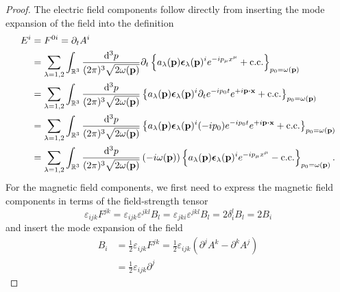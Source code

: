 \begin{proof}
	The electric field components follow directly from inserting the mode expansion of the field into the definition
	\begin{equation*}
		\begin{split}
			E^i
			&=
			F^{0i}
			=
			\partial_t
			A^i
			\\
			&=
			\sum_{\lambda=1,2}
			\int_{\mathbb{R}^3}\frac{\dd[3]{p}}{(2\pi)^3\sqrt{2\omega(\vb{p})}}
			\partial_t
			\left\{
				a_\lambda(\vb{p})
				\boldsymbol{\epsilon}_\lambda(\vb{p})^i
				e^{-ip_\mu x^\mu}
				+
				\text{c.c.}
			\right\}_{p_0=\omega(\vb{p})}
			\\
			&=
			\sum_{\lambda=1,2}
			\int_{\mathbb{R}^3}\frac{\dd[3]{p}}{(2\pi)^3\sqrt{2\omega(\vb{p})}}
			\left\{
				a_\lambda(\vb{p})
				\boldsymbol{\epsilon}_\lambda(\vb{p})^i
				\partial_t
				e^{-ip_0t}
				e^{+i\vb{p}\vdot\vb{x}}
				+
				\text{c.c.}
			\right\}_{p_0=\omega(\vb{p})}
			\\
			&=
			\sum_{\lambda=1,2}
			\int_{\mathbb{R}^3}\frac{\dd[3]{p}}{(2\pi)^3\sqrt{2\omega(\vb{p})}}
			\left\{
				a_\lambda(\vb{p})
				\boldsymbol{\epsilon}_\lambda(\vb{p})^i
				(-ip_0)
				e^{-ip_0t}
				e^{+i\vb{p}\vdot\vb{x}}
				+
				\text{c.c.}
			\right\}_{p_0=\omega(\vb{p})}
			\\
			&=
			\sum_{\lambda=1,2}
			\int_{\mathbb{R}^3}\frac{\dd[3]{p}}{(2\pi)^3\sqrt{2\omega(\vb{p})}}
			\left(-i\omega(\vb{p})\right)
			\left\{
				a_\lambda(\vb{p})
				\boldsymbol{\epsilon}_\lambda(\vb{p})^i
				e^{-ip_\mu x^\mu}
				-
				\text{c.c.}
			\right\}_{p_0=\omega(\vb{p})}
			.
		\end{split}
	\end{equation*}
	For the magnetic field components, we first need to express the magnetic field components in terms of the field-strength tensor
	\begin{equation*}
		\varepsilon_{ijk}
		F^{jk}
		=
		\varepsilon_{ijk}
		\varepsilon^{jkl}
		B_l
		=
		\varepsilon_{jki}
		\varepsilon^{jkl}
		B_l
		=
		2
		\delta_i^l
		B_l
		=
		2B_i
	\end{equation*}
	and insert the mode expansion of the field
	\begin{equation*}
		\begin{split}
			B_i
			&=
			\frac{1}{2}
			\varepsilon_{ijk}
			F^{jk}
			=
			\frac{1}{2}
			\varepsilon_{ijk}
			\left(
				\partial^j
				A^k
				-
				\partial^k
				A^j
			\right)
			\\
			&=
			\frac{1}{2}
			\varepsilon_{ijk}
			\partial^j

\end{split}
\end{equation*}
\end{proof}
